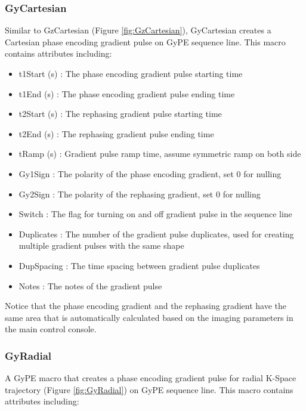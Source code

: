 \documentclass{book}%
\begin{document}
\subsubsection{GyCartesian}

Similar to GzCartesian (Figure \ref{fig:GzCartesian}), GyCartesian creates a Cartesian phase encoding gradient pulse on GyPE sequence line. This macro contains attributes including:

\begin{itemize}
	\item t1Start (s) : The phase encoding gradient pulse starting time
	\item t1End (s) : The phase encoding gradient pulse ending time
	\item t2Start (s) : The rephasing gradient pulse starting time
	\item t2End (s) : The rephasing gradient pulse ending time
	\item tRamp (s) : Gradient pulse ramp time, assume symmetric ramp on both side
	\item Gy1Sign : The polarity of the phase encoding gradient, set 0 for nulling
	\item Gy2Sign : The polarity of the rephasing gradient, set 0 for nulling
	\item Switch : The flag for turning on and off gradient pulse in the sequence line
	\item Duplicates : The number of the gradient pulse duplicates, used for creating multiple gradient pulses with the same shape
	\item DupSpacing : The time spacing between gradient pulse duplicates
	\item Notes : The notes of the gradient pulse 
\end{itemize}

Notice that the phase encoding gradient and the rephasing gradient have the same area that is automatically calculated based on the imaging parameters in the main control console.


\subsubsection{GyRadial}

A GyPE macro that creates a phase encoding gradient pulse for radial K-Space trajectory (Figure \ref{fig:GyRadial}) on GyPE sequence line. This macro contains attributes including:
\end{document}
